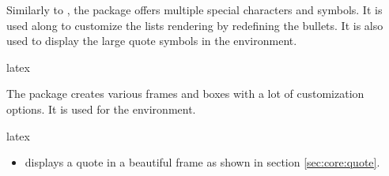 \documentclass{report}
\begin{document}
Similarly to , the  package offers multiple special characters and symbols. 
It is used along  to customize the lists rendering by redefining the bullets. 
It is also used to display the large quote symbols in the  environment.

\begin{imtaCode}{latex}
    \RequirePackage{pifont}
\end{imtaCode}


The  package creates various frames and boxes with a lot of customization options. 
It is used for the  environment.

\begin{imtaCode}{latex}
    \RequirePackage{mdframed}
\end{imtaCode}



\begin{itemize}
    \item {} displays a quote in a beautiful frame as shown in section \ref{sec:core:quote}.
\end{itemize}
\end{document}
